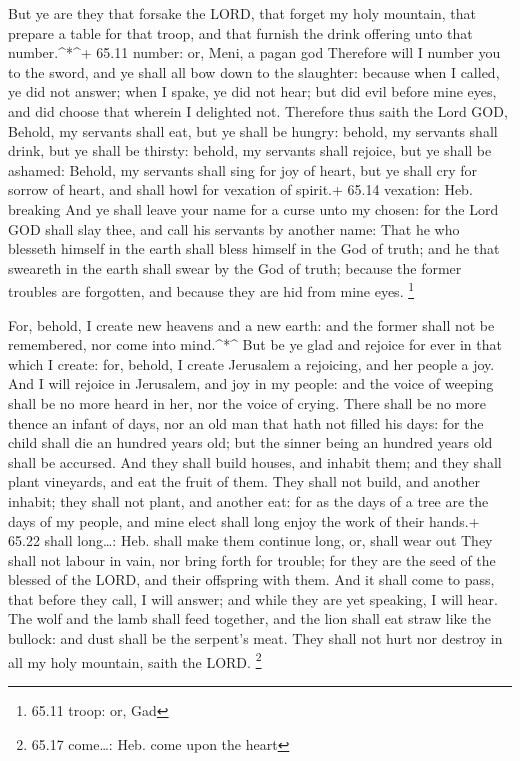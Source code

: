  But ye are they that forsake the LORD, that forget my holy
mountain, that prepare a table for that troop, and that furnish the
drink offering unto that number.\^{}*\^{}+ 65.11 number: or, Meni, a
pagan god  Therefore will I number you to the sword, and ye
shall all bow down to the slaughter: because when I called, ye did not
answer; when I spake, ye did not hear; but did evil before mine eyes,
and did choose that wherein I delighted not.  Therefore
thus saith the Lord GOD, Behold, my servants shall eat, but ye shall be
hungry: behold, my servants shall drink, but ye shall be thirsty:
behold, my servants shall rejoice, but ye shall be ashamed:
 Behold, my servants shall sing for joy of heart, but ye
shall cry for sorrow of heart, and shall howl for vexation of spirit.+
65.14 vexation: Heb. breaking  And ye shall leave your name
for a curse unto my chosen: for the Lord GOD shall slay thee, and call
his servants by another name:  That he who blesseth himself
in the earth shall bless himself in the God of truth; and he that
sweareth in the earth shall swear by the God of truth; because the
former troubles are forgotten, and because they are hid from mine eyes.
\footnote{65.11 troop: or, Gad}

 For, behold, I create new heavens and a new earth: and the
former shall not be remembered, nor come into mind.\^{}*\^{}
 But be ye glad and rejoice for ever in that which I
create: for, behold, I create Jerusalem a rejoicing, and her people a
joy.  And I will rejoice in Jerusalem, and joy in my
people: and the voice of weeping shall be no more heard in her, nor the
voice of crying.  There shall be no more thence an infant
of days, nor an old man that hath not filled his days: for the child
shall die an hundred years old; but the sinner being an hundred years
old shall be accursed.  And they shall build houses, and
inhabit them; and they shall plant vineyards, and eat the fruit of them.
 They shall not build, and another inhabit; they shall not
plant, and another eat: for as the days of a tree are the days of my
people, and mine elect shall long enjoy the work of their hands.+ 65.22
shall long\ldots: Heb. shall make them continue long, or, shall wear out
 They shall not labour in vain, nor bring forth for
trouble; for they are the seed of the blessed of the LORD, and their
offspring with them.  And it shall come to pass, that
before they call, I will answer; and while they are yet speaking, I will
hear.  The wolf and the lamb shall feed together, and the
lion shall eat straw like the bullock: and dust shall be the serpent's
meat. They shall not hurt nor destroy in all my holy mountain, saith the
LORD. \footnote{65.17 come\ldots: Heb. come upon the heart}

